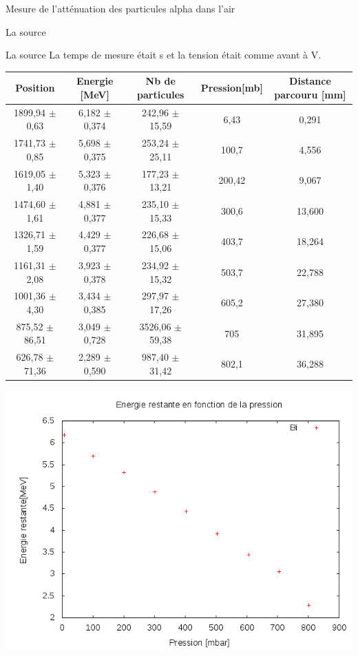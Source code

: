 \documentclass[a4paper,11pt]{scrartcl}
\begin{document}
\begin{section}{Mesure de l'atténuation des particules alpha dans l'air}
\begin{subsection}{La source }
\begin{minipage}{0.45\textwidth}
    \end{minipage}
   \end{subsection}

   \begin{subsection}{La source }
    La temps de mesure était \unit[30]{s} et la tension était comme avant à \unit[80]{V}.
    \begin{center}
     \begin{tabular}{c|c|c|c|c}
      Position	&Energie [MeV]	&Nb de particules	&Pression[mb]	&Distance parcouru [mm]\\ \hline
      1899,94 $\pm$ 0,63	&6,182 $\pm$ 0,374	&242,96 $\pm$ 15,59	&6,43	&0,291\\
      1741,73 $\pm$ 0,85	&5,698 $\pm$ 0,375	&253,24 $\pm$ 25,11	&100,7	&4,556\\
      1619,05 $\pm$ 1,40	&5,323 $\pm$ 0,376	&177,23 $\pm$ 13,21	&200,42	&9,067\\
      1474,60 $\pm$ 1,61	&4,881 $\pm$ 0,377	&235,10 $\pm$ 15,33	&300,6	&13,600\\
      1326,71 $\pm$ 1,59	&4,429 $\pm$ 0,377	&226,68 $\pm$ 15,06	&403,7	&18,264\\
      1161,31 $\pm$ 2,08	&3,923 $\pm$ 0,378	&234,92 $\pm$ 15,32	&503,7	&22,788\\
      1001,36 $\pm$ 4,30	&3,434 $\pm$ 0,385	&297,97 $\pm$ 17,26	&605,2	&27,380\\
      875,52 $\pm$ 86,51	&3,049 $\pm$ 0,728	&3526,06 $\pm$ 59,38	&705	&31,895\\
      626,78 $\pm$ 71,36	&2,289 $\pm$ 0,590	&987,40 $\pm$ 31,42	&802,1	&36,288\\
     \end{tabular}
    \end{center}
    \begin{minipage}{0.45\textwidth}
     \includegraphics[width=\textwidth]{Sabine/bi_pression.png}

\end{minipage}
\end{subsection}
\end{section}
\end{document}
